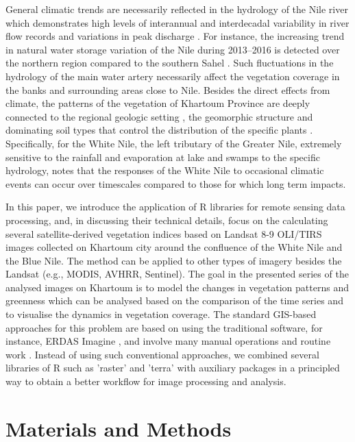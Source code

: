 \documentclass[jimaging,article,submit,pdftex,moreauthors]{Definitions/mdpi}
\begin{document}
General climatic trends are necessarily reflected in the hydrology of the Nile river which demonstrates high levels of interannual and interdecadal variability in river flow records \cite{CONWAY200599} and variations in peak discharge \cite{Babiker}. For instance, the increasing trend in natural water storage variation of the Nile during 2013–2016 is detected over the northern region compared to the southern Sahel \cite{ABDELMALIK2019103596}. Such fluctuations in the hydrology of the main water artery necessarily affect the vegetation coverage in the banks and surrounding areas close to Nile. Besides the direct effects from climate, the patterns of the vegetation of Khartoum Province are deeply connected to the regional geologic setting \cite{ELSHEIKH201182}, the geomorphic structure and dominating soil types that control the distribution of the specific plants \cite{Mahmoud}. Specifically, for the White Nile, the left tributary of the Greater Nile, extremely sensitive to the rainfall and evaporation at lake and swamps to the specific hydrology, \cite{Sene} notes that the responses of the White Nile to occasional climatic events can occur over timescales compared to those for which long term impacts.

In this paper, we introduce the application of R libraries for remote sensing data processing, and, in discussing their technical details, focus on the calculating several satellite-derived vegetation indices based on Landsat 8-9 OLI/TIRS images collected on Khartoum city around the confluence of the White Nile and the Blue Nile. The method can be applied to other types of imagery besides the Landsat (e.g., MODIS, AVHRR, Sentinel). The goal in the presented series of the analysed images on Khartoum is to model the changes in vegetation patterns and greenness which can be analysed based on the comparison of the time series and to visualise the dynamics in vegetation coverage. The standard GIS-based approaches for this problem are based on using the traditional software, for instance, ERDAS Imagine \cite{AHMED201829}, and involve many manual operations and routine work \cite{Hawash,YOUSSEF2020103777,6621869,Aldoma}. Instead of using such conventional approaches,  we combined several libraries of R such as 'raster' and 'terra' with auxiliary packages in a principled way to obtain a better workflow for image processing and analysis.


\section{Materials and Methods}
\end{document}
